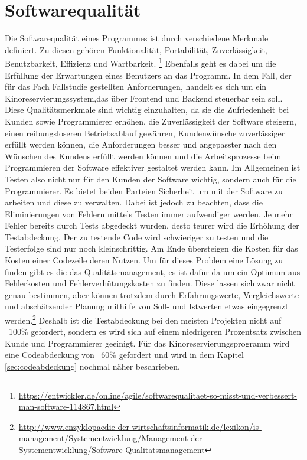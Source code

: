 \section{Softwarequalität}

Die Softwarequalität eines Programmes ist durch verschiedene Merkmale definiert. Zu diesen gehören Funktionalität, Portabilität, Zuverlässigkeit, Benutzbarkeit, Effizienz und Wartbarkeit. \footnote{\url{https://entwickler.de/online/agile/softwarequalitaet-so-misst-und-verbessert-man-software-114867.html}}
Ebenfalls geht es dabei um die Erfüllung der Erwartungen eines Benutzers an das Programm. In dem Fall, der für das Fach Fallstudie gestellten Anforderungen, handelt es sich um ein Kinoreservierungssystem,das über Frontend und Backend steuerbar sein soll.
Diese Qualitätsmerkmale sind wichtig einzuhalten, da sie die Zufriedenheit bei Kunden sowie Programmierer erhöhen, die Zuverlässigkeit der Software steigern, einen reibungsloseren Betriebsablauf gewähren, Kundenwünsche zuverlässiger erfüllt werden können, die Anforderungen besser und angepasster nach den Wünschen des Kundens erfüllt werden können und die Arbeitsprozesse beim Programmieren der Software effektiver gestaltet werden kann.
Im Allgemeinen ist Testen also nicht nur für den Kunden der Software wichtig, sondern auch für die Programmierer. 
Es bietet beiden Parteien Sicherheit um mit der Software zu arbeiten und diese zu verwalten. 
Dabei ist jedoch zu beachten, dass die Eliminierungen von Fehlern mittels Testen immer aufwendiger werden.
Je mehr Fehler bereits durch Tests abgedeckt wurden, desto teurer wird die Erhöhung der Testabdeckung. Der zu testende Code wird schwieriger zu testen und die Testerfolge sind nur noch kleinschrittig. Am Ende übersteigen die Kosten für das Kosten einer Codezeile deren Nutzen. Um für dieses Problem eine Lösung zu finden gibt es die das Qualitätsmanagement, es ist dafür da um ein Optimum aus Fehlerkosten und Fehlerverhütungskosten zu finden. Diese lassen sich zwar nicht genau bestimmen, aber können trotzdem durch Erfahrungswerte, Vergleichswerte und abschätzender Planung mithilfe von Soll- und Istwerten etwas eingegrenzt werden.\footnote{\url{http://www.enzyklopaedie-der-wirtschaftsinformatik.de/lexikon/is-management/Systementwicklung/Management-der-Systementwicklung/Software-Qualitatsmanagement}} Deshalb ist die Testabdeckung bei den meisten Projekten nicht auf ~100\% gefordert, sondern es wird sich auf einem niedrigeren Prozentsatz zwischen Kunde und Programmierer geeinigt. Für das Kinoreservierungsprogramm wird eine Codeabdeckung von ~60\% gefordert und wird in dem Kapitel \vref{sec:codeabdeckung} nochmal näher beschrieben.
